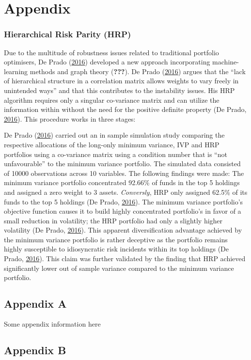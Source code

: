 \documentclass[11pt,preprint, authoryear]{elsarticle}
\numberwithin{equation}{section}
\numberwithin{figure}{section}
\numberwithin{table}{section}
\begin{document}
\newpage

\hypertarget{appendix}{%
\section*{Appendix}\label{appendix}}

\hypertarget{hierarchical-risk-parity-hrp}{%
\subsubsection{Hierarchical Risk Parity
(HRP)}\label{hierarchical-risk-parity-hrp}}

Due to the multitude of robustness issues related to traditional
portfolio optimisers, De Prado (\protect\hyperlink{ref-lopez}{2016})
developed a new approach incorporating machine-learning methods and
graph theory ({\textbf{???}}). De Prado
(\protect\hyperlink{ref-lopez}{2016}) argues that the ``lack of
hierarchical structure in a correlation matrix allows weights to vary
freely in unintended ways'' and that this contributes to the instability
issues. His HRP algorithm requires only a singular co-variance matrix
and can utilize the information within without the need for the positive
definite property (De Prado, \protect\hyperlink{ref-lopez}{2016}). This
procedure works in three stages:

De Prado (\protect\hyperlink{ref-lopez}{2016}) carried out an in sample
simulation study comparing the respective allocations of the long-only
minimum variance, IVP and HRP portfolios using a co-variance matrix
using a condition number that is ``not unfavourable'' to the minimum
variance portfolio. The simulated data consisted of 10000 observations
across 10 variables. The following findings were made: The minimum
variance portfolio concentrated 92.66\% of funds in the top 5 holdings
and assigned a zero weight to 3 assets. \emph{Conversly}, HRP only
assigned 62.5\% of its funds to the top 5 holdings (De Prado,
\protect\hyperlink{ref-lopez}{2016}). The minimum variance portfolio's
objective function causes it to build highly concentrated portfolio's in
favor of a small reduction in volatility; the HRP portfolio had only a
slightly higher volatility (De Prado,
\protect\hyperlink{ref-lopez}{2016}). This apparent diversification
advantage achieved by the minimum variance portfolio is rather deceptive
as the portfolio remains highly susceptible to idiosyncratic risk
incidents within its top holdings (De Prado,
\protect\hyperlink{ref-lopez}{2016}). This claim was further validated
by the finding that HRP achieved significantly lower out of sample
variance compared to the minimum variance portfolio.

\hypertarget{appendix-a}{%
\subsection*{Appendix A}\label{appendix-a}}

Some appendix information here

\hypertarget{appendix-b}{%
\subsection*{Appendix B}\label{appendix-b}}


\end{document}
